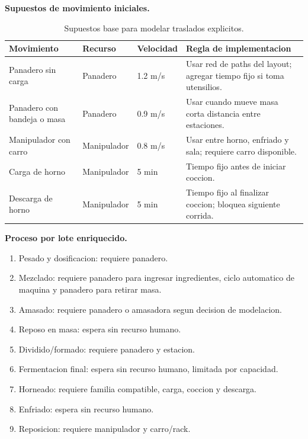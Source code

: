 \documentclass[12pt]{article}
\begin{document}
\textbf{Supuestos de movimiento iniciales.}
\begin{table}[H]
\centering
\caption{Supuestos base para modelar traslados explicitos.}
\begingroup
\small
\setlength{\tabcolsep}{3pt}
\begin{tabularx}{\textwidth}{@{}L{3.0cm}L{2.55cm}C{1.7cm}Y@{}}
\toprule
{}
\color{white}Movimiento & \color{white}Recurso & \color{white}Velocidad & \color{white}Regla de implementacion \\
\midrule
Panadero sin carga & Panadero & 1.2 m/s & Usar red de paths del layout; agregar tiempo fijo si toma utensilios. \\
Panadero con bandeja o masa & Panadero & 0.9 m/s & Usar cuando mueve masa corta distancia entre estaciones. \\
Manipulador con carro & Manipulador & 0.8 m/s & Usar entre horno, enfriado y sala; requiere carro disponible. \\
Carga de horno & Manipulador & 5 min & Tiempo fijo antes de iniciar coccion. \\
Descarga de horno & Manipulador & 5 min & Tiempo fijo al finalizar coccion; bloquea siguiente corrida. \\
\bottomrule
\end{tabularx}
\endgroup
\end{table}

\textbf{Proceso por lote enriquecido.}
\begin{enumerate}
  \item Pesado y dosificacion: requiere panadero.
  \item Mezclado: requiere panadero para ingresar ingredientes, ciclo automatico de maquina y panadero para retirar masa.
  \item Amasado: requiere panadero o amasadora segun decision de modelacion.
  \item Reposo en masa: espera sin recurso humano.
  \item Dividido/formado: requiere panadero y estacion.
  \item Fermentacion final: espera sin recurso humano, limitada por capacidad.
  \item Horneado: requiere familia compatible, carga, coccion y descarga.
  \item Enfriado: espera sin recurso humano.
  \item Reposicion: requiere manipulador y carro/rack.
\end{enumerate}
\end{document}
